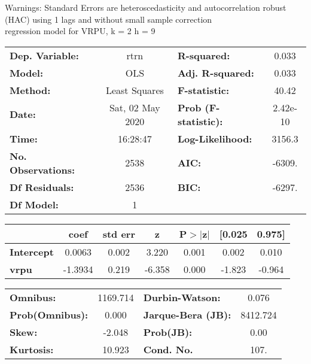 Warnings: \newline
 [1] Standard Errors are heteroscedasticity and autocorrelation robust (HAC) using 1 lags and without small sample correction\\ 

regression model for VRPU, k = 2 h = 9\begin{center}
\begin{tabular}{lclc}
\toprule
\textbf{Dep. Variable:}    &       rtrn       & \textbf{  R-squared:         } &     0.033   \\
\textbf{Model:}            &       OLS        & \textbf{  Adj. R-squared:    } &     0.033   \\
\textbf{Method:}           &  Least Squares   & \textbf{  F-statistic:       } &     40.42   \\
\textbf{Date:}             & Sat, 02 May 2020 & \textbf{  Prob (F-statistic):} &  2.42e-10   \\
\textbf{Time:}             &     16:28:47     & \textbf{  Log-Likelihood:    } &    3156.3   \\
\textbf{No. Observations:} &        2538      & \textbf{  AIC:               } &    -6309.   \\
\textbf{Df Residuals:}     &        2536      & \textbf{  BIC:               } &    -6297.   \\
\textbf{Df Model:}         &           1      & \textbf{                     } &             \\
\bottomrule
\end{tabular}
\begin{tabular}{lcccccc}
                   & \textbf{coef} & \textbf{std err} & \textbf{z} & \textbf{P$> |$z$|$} & \textbf{[0.025} & \textbf{0.975]}  \\
\midrule
\textbf{Intercept} &       0.0063  &        0.002     &     3.220  &         0.001        &        0.002    &        0.010     \\
\textbf{vrpu}      &      -1.3934  &        0.219     &    -6.358  &         0.000        &       -1.823    &       -0.964     \\
\bottomrule
\end{tabular}
\begin{tabular}{lclc}
\textbf{Omnibus:}       & 1169.714 & \textbf{  Durbin-Watson:     } &    0.076  \\
\textbf{Prob(Omnibus):} &   0.000  & \textbf{  Jarque-Bera (JB):  } & 8412.724  \\
\textbf{Skew:}          &  -2.048  & \textbf{  Prob(JB):          } &     0.00  \\
\textbf{Kurtosis:}      &  10.923  & \textbf{  Cond. No.          } &     107.  \\
\bottomrule
\end{tabular}
\end{center}

